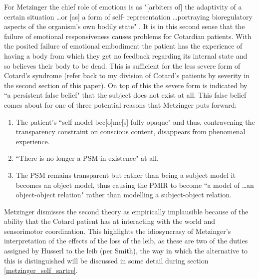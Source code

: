 For Metzinger the chief role of emotions is as "[arbiters of] the adaptivity of a certain situation \ldots or [as] a form of self- representation \ldots portraying bioregulatory aspects of the organism's own bodily state" \cite[p. 199]{metzinger2003}. It is in this second sense that the failure of emotional responsiveness causes problems for Cotardian patients. With the posited failure of emotional embodiment the patient has the experience of having a body from which they get no feedback regarding its internal state and so believes their body to be dead. This is sufficient for the less severe form of Cotard's syndrome (refer back to my division of Cotard's patients by severity in the second section of this paper). On top of this the severe form is indicated by ``a persistent false belief" \cite[p. 459]{metzinger2003} that the subject does not exist at all. This false belief comes about for one of three potential reasons that Metzinger puts forward:
\begin{enumerate}
    \item The patient's ``self model bec[o]me[s] fully opaque" \cite[p. 460]{metzinger2003} and thus, contravening the transparency constraint on conscious content, disappears from phenomenal experience.
    \item ``There is no longer a PSM in existence"\cite[p. 460]{metzinger2003} at all.
    \item The PSM remains transparent but rather than being a subject model it becomes an object model, thus causing the PMIR to become ``a model of \ldots an object-object relation" \cite[p. 460]{metzinger2003} rather than modelling a subject-object relation.
\end{enumerate}

Metzinger dismisses the second theory as empirically implausible because of the ability that the Cotard patient has at interacting with the world and sensorimotor coordination. This highlights the idiosyncrasy of Metzinger's interpretation of the effects of the loss of the leib, as these are two of the duties assigned by Husserl to the leib (per Smith), the way in which the alternative to this is distinguished will be discussed in some detail during section \ref{metzinger_self_sartre}.

